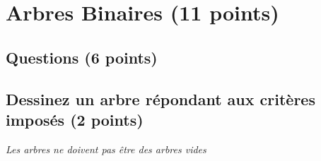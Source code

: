 \documentclass[11pt,a4paper]{article}
\begin{document}


\vspace*{-0.75cm}


\section{Arbres Binaires (11 points)}

\subsection*{Questions (6 points) }

\subsection{Dessinez un arbre répondant aux critères imposés (2 points) }

\begin{center}
\textit{Les arbres ne doivent pas être des arbres vides}
\end{center}

\vspace{-0.5cm}
\end{document}
